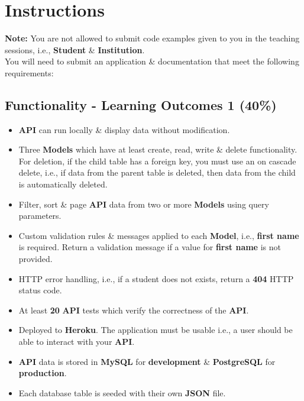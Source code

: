 \documentclass{article}
\begin{document}
\newpage

\section*{Instructions}
\textbf{Note:} You are not allowed to submit code examples given to you in the teaching sessions, i.e., \textbf{Student} \& \textbf{Institution}. \\

You will need to submit an application \& documentation that meet the following requirements:

\subsection*{Functionality - Learning Outcomes 1 (40\%)}
\begin{itemize}
	\item \textbf{API} can run locally \& display data without modification.
	\item Three \textbf{Models} which have at least create, read, write \& delete functionality. For deletion, if the child table has a foreign key, you must use an on cascade delete, i.e., if data from the parent table is deleted, then data from the child is automatically deleted.
	\item Filter, sort \& page \textbf{API} data from two or more \textbf{Models} using query parameters.
	\item Custom validation rules \& messages applied to each \textbf{Model}, i.e., \textbf{first name }is required. Return a validation message if a value for \textbf{first name} is not provided.
	\item HTTP error handling, i.e., if a student does not exists, return a \textbf{404} HTTP status code.
	\item At least \textbf{20} \textbf{API} tests which verify the correctness of the \textbf{API}.
	\item Deployed to \textbf{Heroku}. The application must be usable i.e., a user should be able to interact with your \textbf{API}.
	\item \textbf{API} data is stored in \textbf{MySQL} for \textbf{development} \& \textbf{PostgreSQL} for \textbf{production}.
	\item Each database table is seeded with their own \textbf{JSON} file.
\end{itemize}
\end{document}
